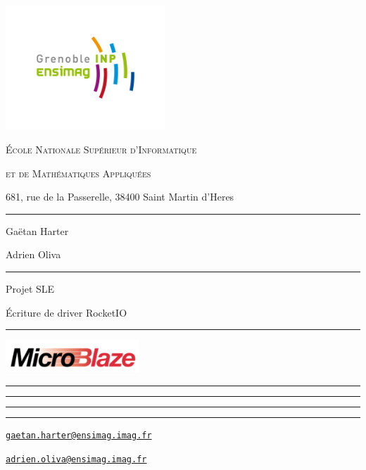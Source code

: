 \documentclass[a4paper,10pt]{article}
\begin{document}
\begin{flushright}
\vspace{5mm}\includegraphics[width=6cm]{../img/ensimag.png}

\footnotesize{\textsc{\'Ecole Nationale Sup\'erieur d'Informatique}}

\footnotesize{\textsc{ et de Math\'ematiques Appliqu\'ees}}

\footnotesize{681, rue de la Passerelle, 38400 Saint Martin d'Heres}
\end{flushright}

\rule{5cm}{1pt}

Gaëtan Harter

Adrien Oliva

\rule{5cm}{1pt}

\vspace{2cm}

\begin{center}

\begin{LARGE}
Projet SLE
\end{LARGE}

\begin{LARGE}
Écriture de driver RocketIO
\end{LARGE}

\vspace{5mm}

\begin{Large}
\TITLE
\end{Large}

\rule{6cm}{2pt}
\end{center}

\vspace{25mm}

\begin{flushright}

\includegraphics[width=5cm]{../img/microblaze.png}

\rule{11cm}{0.5pt}

\vspace{-3mm}
\rule{7cm}{0.5pt}

\vspace{-3mm}
\rule{5cm}{0.5pt}

\vspace{-3mm}
\rule{4cm}{0.5pt}

\vspace{5mm}
\href{mailto:gaetan.harter@ensimag.imag.fr}
{\texttt{gaetan.harter@ensimag.imag.fr}}

\href{mailto:adrien.oliva@ensimag.imag.fr}
{\texttt{adrien.oliva@ensimag.imag.fr}}
\end{flushright}

\vfill
\eject

\tableofcontents

\vfill
\eject
\end{document}

